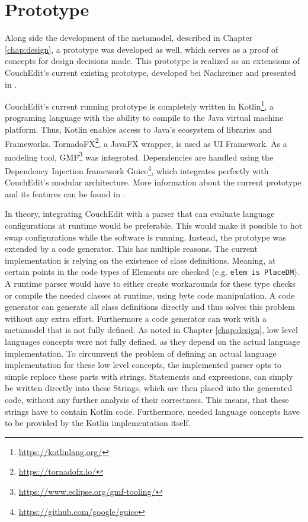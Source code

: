 \chapter{Prototype}
\label{chap:prototype}
Along side the development of the metamodel, described in Chapter \ref{chap:design}, a prototype was developed as well, which serves as a proof of concepts for design decisions made. This prototype is realized as an extensions of CouchEdit's current existing prototype, developed bei Nachreiner and presented in \cite{nachreiner_couchedit_2020}.

CouchEdit's current running prototype is completely written in Kotlin\footnote{\url{https://kotlinlang.org/}}, a programing language with the ability to compile to the Java virtual machine platform. Thus, Kotlin enables access to Java's ecosystem of libraries and Frameworks. TornadoFX\footnote{\url{https://tornadofx.io/}}, a JavaFX wrapper, is used as UI Framework. As a modeling tool, GMF\footnote{\url{https://www.eclipse.org/gmf-tooling/}} was integrated. Dependencies are handled using the Dependency Injection framework Guice\footnote{\url{https://github.com/google/guice}}, which integrates perfectly with CouchEdit's modular architecture. More information about the current prototype and its features can be found in \cite{nachreiner_couchedit_2020}.

In theory, integrating CouchEdit with a parser that can evaluate language configurations at runtime would be preferable. This would make it possible to hot swap configurations while the software is running. Instead, the prototype was extended by a code generator. This has multiple reasons. The current implementation is relying on the existence of class definitions. Meaning, at certain points in the code types of Elements are checked (e.g. \texttt{elem is PlaceDM}). A runtime parser would have to either create workarounds for these type checks or compile the needed classes at runtime, using byte code manipulation. A code generator can generate all class definitions directly and thus solves this problem without any extra effort. Furthermore a code generator can work with a metamodel that is not fully defined. As noted in Chapter \ref{chap:design}, low level languages concepts were not fully defined, as they depend on the actual language implementation. To circumvent the problem of defining an actual language implementation for these low level concepts, the implemented parser opts to simple replace these parts with strings. Statements and expressions, can simply be written directly into these Strings, which are then placed into the generated code, without any further analysis of their correctness. This means, that these strings have to contain Kotlin code. Furthermore, needed language concepts have to be provided by the Kotlin implementation itself.

